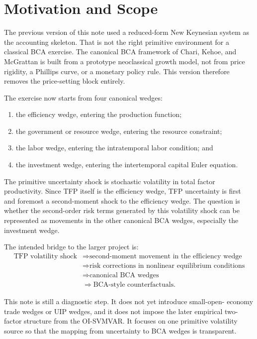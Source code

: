 \section{Motivation and Scope}

The previous version of this note used a reduced-form New Keynesian system as
the accounting skeleton. That is not the right primitive environment for a
classical BCA exercise. The canonical BCA framework of Chari, Kehoe, and
McGrattan is built from a prototype neoclassical growth model, not from price
rigidity, a Phillips curve, or a monetary policy rule. This version therefore
removes the price-setting block entirely.

The exercise now starts from four canonical wedges:
\begin{enumerate}[label=(\roman*)]
    \item the efficiency wedge, entering the production function;
    \item the government or resource wedge, entering the resource constraint;
    \item the labor wedge, entering the intratemporal labor condition; and
    \item the investment wedge, entering the intertemporal capital Euler
    equation.
\end{enumerate}
The primitive uncertainty shock is stochastic volatility in total factor
productivity. Since TFP itself is the efficiency wedge, TFP uncertainty is first
and foremost a second-moment shock to the efficiency wedge. The question is
whether the second-order risk terms generated by this volatility shock can be
represented as movements in the other canonical BCA wedges, especially the
investment wedge.

The intended bridge to the larger project is:
\begin{align*}
    \text{TFP volatility shock}
    &\Rightarrow
    \text{second-moment movement in the efficiency wedge}
    \\
    &\Rightarrow
    \text{risk corrections in nonlinear equilibrium conditions}
    \\
    &\Rightarrow
    \text{canonical BCA wedges}
    \\
    &\Rightarrow
    \text{BCA-style counterfactuals}.
\end{align*}

This note is still a diagnostic step. It does not yet introduce small-open-
economy trade wedges or UIP wedges, and it does not impose the later empirical
two-factor structure from the OI-SVMVAR. It focuses on one primitive volatility
source so that the mapping from uncertainty to BCA wedges is transparent.
